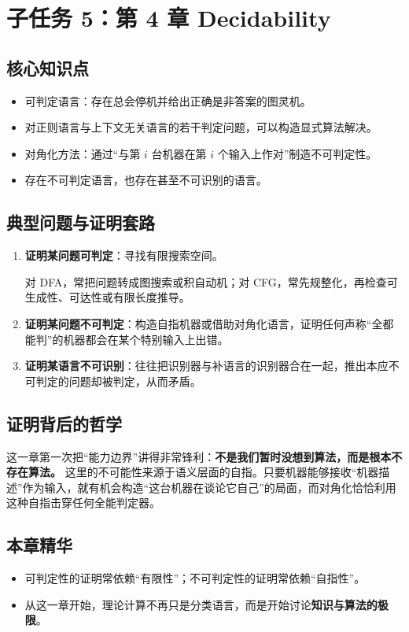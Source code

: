 \section{子任务 5：第 4 章 Decidability}

\subsection{核心知识点}

\begin{itemize}[leftmargin=2em]
  \item 可判定语言：存在总会停机并给出正确是非答案的图灵机。
  \item 对正则语言与上下文无关语言的若干判定问题，可以构造显式算法解决。
  \item 对角化方法：通过“与第 $i$ 台机器在第 $i$ 个输入上作对”制造不可判定性。
  \item 存在不可判定语言，也存在甚至不可识别的语言。
\end{itemize}

\subsection{典型问题与证明套路}

\begin{enumerate}[leftmargin=2em]
  \item \textbf{证明某问题可判定}：寻找有限搜索空间。
  
  对 DFA，常把问题转成图搜索或积自动机；对 CFG，常先规整化，再检查可生成性、可达性或有限长度推导。
  \item \textbf{证明某问题不可判定}：构造自指机器或借助对角化语言，证明任何声称“全都能判”的机器都会在某个特别输入上出错。
  \item \textbf{证明某语言不可识别}：往往把识别器与补语言的识别器合在一起，推出本应不可判定的问题却被判定，从而矛盾。
\end{enumerate}

\subsection{证明背后的哲学}

这一章第一次把“能力边界”讲得非常锋利：\textbf{不是我们暂时没想到算法，而是根本不存在算法。}
这里的不可能性来源于语义层面的自指。只要机器能够接收“机器描述”作为输入，就有机会构造“这台机器在谈论它自己”的局面，而对角化恰恰利用这种自指击穿任何全能判定器。

\subsection{本章精华}

\begin{itemize}[leftmargin=2em]
  \item 可判定性的证明常依赖“有限性”；不可判定性的证明常依赖“自指性”。
  \item 从这一章开始，理论计算不再只是分类语言，而是开始讨论\textbf{知识与算法的极限}。
\end{itemize}

\newpage
